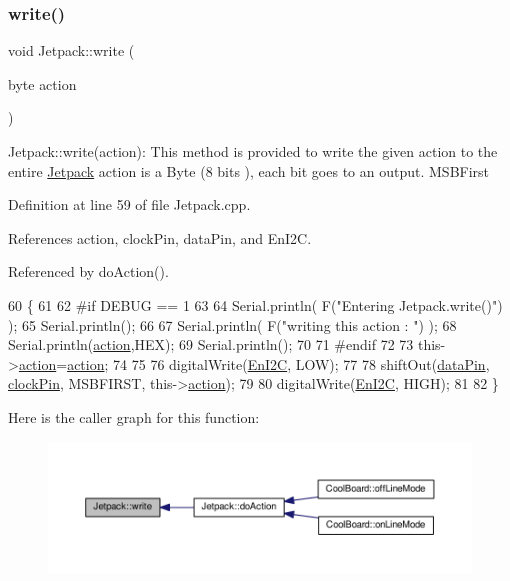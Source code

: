 \subsubsection{\texorpdfstring{write()}{write()}}
{\footnotesize\ttfamily void Jetpack\+::write (\begin{DoxyParamCaption}\item[{byte}]{action }\end{DoxyParamCaption})}

Jetpack\+::write(action)\+: This method is provided to write the given action to the entire \hyperlink{classJetpack}{Jetpack} action is a Byte (8 bits ), each bit goes to an output. M\+S\+B\+First 

Definition at line 59 of file Jetpack.\+cpp.



References action, clock\+Pin, data\+Pin, and En\+I2C.



Referenced by do\+Action().


\begin{DoxyCode}
60 \{
61 
62 \textcolor{preprocessor}{#if DEBUG == 1}
63 
64     Serial.println( F(\textcolor{stringliteral}{"Entering Jetpack.write()"}) );
65     Serial.println();
66 
67     Serial.println( F(\textcolor{stringliteral}{"writing this action : "}) );
68     Serial.println(\hyperlink{classJetpack_aca3142925a7b0834b34ae91d26af7765}{action},HEX);
69     Serial.println();
70 
71 \textcolor{preprocessor}{#endif }
72 
73     this->\hyperlink{classJetpack_aca3142925a7b0834b34ae91d26af7765}{action}=\hyperlink{classJetpack_aca3142925a7b0834b34ae91d26af7765}{action};
74 
75     
76     digitalWrite(\hyperlink{classJetpack_a81df984fb4cea98c71aa1a1cfcdfe814}{EnI2C}, LOW);
77     
78     shiftOut(\hyperlink{classJetpack_a3d669a56e93c71dd25f970d4ed7d0c00}{dataPin}, \hyperlink{classJetpack_a58ebb991f358f3ae94e82148b0221b5a}{clockPin}, MSBFIRST, this->\hyperlink{classJetpack_aca3142925a7b0834b34ae91d26af7765}{action});
79 
80     digitalWrite(\hyperlink{classJetpack_a81df984fb4cea98c71aa1a1cfcdfe814}{EnI2C}, HIGH);
81 
82 \}   
\end{DoxyCode}
Here is the caller graph for this function\+:
\nopagebreak
\begin{figure}[H]
\begin{center}
\leavevmode
\includegraphics[width=350pt]{classJetpack_a338f1af8cbc6504ac69b47c7328569b5_icgraph}
\end{center}
\end{figure}
\mbox{\label{classJetpack_a79ae7bc3c1828a0551a7c005c4f8bd00}} 
